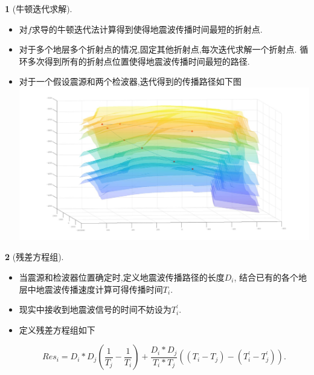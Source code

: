 \documentclass[UTF8]{ctexbeamer}	%
\theoremstyle{plain}
\theoremstyle{definition}
\newtheorem{emt}{}[section]
\theoremstyle{remark}
\numberwithin{equation}{section}
\begin{document}
\begin{frame}
  \begin{emt}[牛顿迭代求解]
      \begin{itemize}
          \item 
          对$f$求导的牛顿迭代法计算得到使得地震波传播时间最短的折射点.

          \item 对于多个地层多个折射点的情况,固定其他折射点,每次迭代求解一个折射点.
          循环多次得到所有的折射点位置使得地震波传播时间最短的路径.

          \item 对于一个假设震源和两个检波器,迭代得到的传播路径如下图
          \includegraphics[width = .6\textwidth]{fig/s2p4.jpg}
      \end{itemize}
  \end{emt}
\end{frame}

\begin{frame}
\begin{emt}[残差方程组]
    \begin{itemize}
        \item 当震源和检波器位置确定时,定义地震波传播路径的长度$D_i$,
        结合已有的各个地层中地震波传播速度计算可得传播时间$T_i$.
        \item 现实中接收到地震波信号的时间不妨设为$T_i^\prime$.
        \item 定义残差方程组如下
        \begin{small}
            \begin{equation}
                Res_i = D_i * D_j(\frac{1}{T_j} - \frac{1}{T_i}) + \frac{D_i * D_j}{T_i * T_j}((T_i - T_j) 
                 - (T_i^\prime - T_j^\prime)).
            \end{equation}
        \end{small}
    \end{itemize}
\end{emt}
\end{frame}
\end{document}

